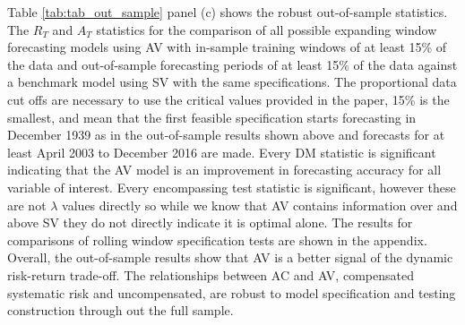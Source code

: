 Table \ref{tab:tab_out_sample} panel (c) shows the robust out-of-sample statistics. The $R_{T}$ and $A_{T}$ statistics for the comparison of all possible expanding window forecasting models using AV with in-sample training windows of at least 15\% of the data and out-of-sample forecasting periods of at least 15\% of the data against a benchmark model using SV with the same specifications. The proportional data cut offs are necessary to use the critical values provided in the \citet{rossi_out--sample_2012} paper, 15\% is the smallest, and mean that the first feasible specification starts forecasting in December 1939 as in the out-of-sample results shown above and forecasts for at least April 2003 to December 2016 are made. Every DM statistic is significant indicating that the AV model is an improvement in forecasting accuracy for all variable of interest. Every encompassing test statistic is significant, however these are not $\lambda$ values directly so while we know that AV contains information over and above SV they do not directly indicate it is optimal alone. The results for comparisons of rolling window specification tests are shown in the appendix. Overall, the out-of-sample results show that AV is a better signal of the dynamic risk-return trade-off. The relationships between AC and AV, compensated systematic risk and uncompensated, are robust to model specification and testing construction through out the full sample.
